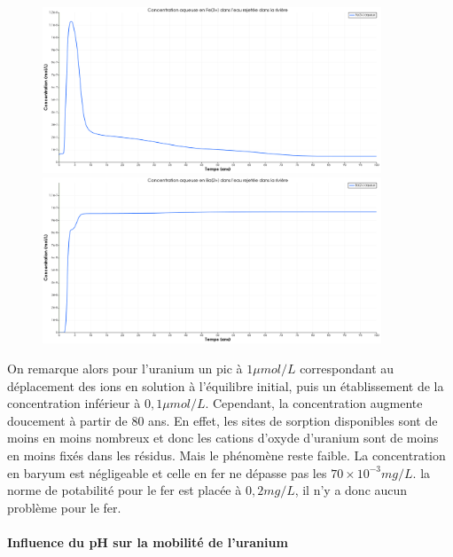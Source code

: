 \documentclass{article}
\begin{document}
\begin{figure}[H]
    \centering
    \begin{minipage}{0.5\textwidth}
        \centering
        \includegraphics[width=0.9\textwidth]{III_B_2_7.png} 
        \caption{}
        \label{fig:Fe_riviere_sable_Base}
    \end{minipage}\hfill
    \begin{minipage}{0.5\textwidth}
        \centering
        \includegraphics[width=0.9\textwidth]{III_B_2_8.png} 
        \caption{}
        \label{fig:Ba_riviere_sable_base}
    \end{minipage}
\end{figure}

On remarque alors pour l’uranium un pic à $1 \mu mol/L$ correspondant au déplacement des ions en solution à l’équilibre initial, puis un établissement de la concentration inférieur à $0,1 \mu mol/L$. Cependant, la concentration augmente doucement à partir de 80 ans. En effet, les sites de sorption disponibles sont de moins en moins nombreux et donc les cations d’oxyde d’uranium sont de moins en moins fixés dans les résidus. Mais le phénomène reste faible. La concentration en baryum est négligeable et celle en fer ne dépasse pas les $70 \times 10^{-3} mg/L$. la norme de potabilité pour le fer est placée à $0,2 mg/L$, il n’y a donc aucun problème pour le fer.


\paragraph{Influence du pH sur la mobilité de l'uranium}
\end{document}
